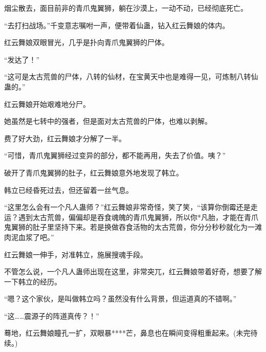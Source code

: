 \begin{this_body}
烟尘散去，面目前非的青爪鬼翼狮，躺在沙漠上，一动不动，已经彻底死亡。

“去打扫战场。”千变意志嘱咐一声，便带着仙蛊，钻入红云舞娘的体内。

红云舞娘双眼冒光，几乎是扑向青爪鬼翼狮的尸体。

“发达了！”

“这可是太古荒兽的尸体，八转的仙材，在宝黄天中也是难得一见，可炼制八转仙蛊的。”

红云舞娘开始艰难地分尸。

她虽然是七转中的强者，但是面对太古荒兽的尸体，也难以剥解。

费了好大劲，红云舞娘才分解了一半。

“可惜，青爪鬼翼狮经过变异的部分，都不能再用，失去了价值。咦？”

破开了青爪鬼翼狮的肚子，红云舞娘意外地发现了韩立。

韩立已经昏死过去，但还留着一丝气息。

“这里怎么会有一个凡人蛊师？”红云舞娘非常奇怪，笑了笑，“该算你倒霉还是走运？遇到太古荒兽，偏偏却是吞食魂魄的青爪鬼翼狮，所以你*凡胎，才能在青爪鬼翼狮的肚子里坚持下来。若是换做吞食活物的太古荒兽，你分分秒秒就化为一滩肉泥血浆了吧。”

红云舞娘一伸手，对准韩立，施展搜魂手段。

不管怎么说，一个凡人蛊师出现在这里，非常突兀，红云舞娘带着好奇，想要了解一下韩立的经历。

“嗯？这个家伙，是叫做韩立吗？虽然没有什么背景，但运道真的不错啊。”

“这……震源子的阵道真传？！”

蓦地，红云舞娘瞳孔一扩，双眼暴****芒，鼻息也在瞬间变得粗重起来。(未完待续。)

\end{this_body}

